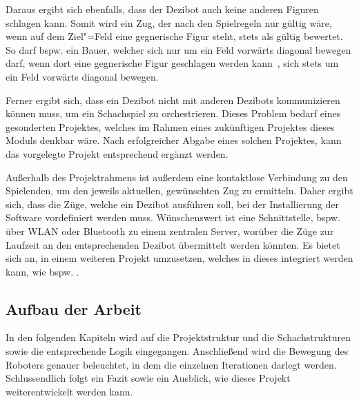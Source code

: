 
Daraus ergibt sich ebenfalls, dass der Dezibot auch keine anderen Figuren schlagen kann. Somit wird ein Zug, der nach den Spielregeln nur gültig wäre, wenn auf dem Ziel"=Feld eine gegnerische Figur steht, stets als gültig bewertet. So darf bspw. ein Bauer, welcher sich nur um ein Feld vorwärts diagonal bewegen darf, wenn dort eine gegnerische Figur geschlagen werden kann~\cite{justUSChessFederations2019}, sich stets um ein Feld vorwärts diagonal bewegen.


Ferner ergibt sich, dass ein Dezibot nicht mit anderen Dezibots kommunizieren können muss, um ein Schachspiel zu orchestrieren. Dieses Problem bedarf eines gesonderten Projektes, welches im Rahmen eines zukünftigen Projektes dieses Moduls denkbar wäre. Nach erfolgreicher Abgabe eines solchen Projektes, kann das vorgelegte Projekt entsprechend ergänzt werden.


Außerhalb des Projektrahmens ist außerdem eine kontaktlose Verbindung zu den Spielenden, um den jeweils aktuellen, gewünschten Zug zu ermitteln. Daher ergibt sich, dass die Züge, welche ein Dezibot ausführen soll, bei der Installierung der Software vordefiniert werden muss. Wünschenswert ist eine Schnittstelle, bspw. über WLAN oder Bluetooth zu einem zentralen Server, worüber die Züge zur Laufzeit an den entsprechenden Dezibot übermittelt werden könnten. Es bietet sich an, in einem weiteren Projekt umzusetzen, welches in dieses integriert werden kann, wie bspw. \cite{bruderMoseschmiedelDezibot2025,dietrichTimDietrichDezibotlogging2025,richterCurvesHubDezibotDebugInterface2025}.


\subsection{Aufbau der Arbeit}

In den folgenden Kapiteln wird auf die Projektstruktur und die Schachstrukturen sowie die entsprechende Logik eingegangen. Anschließend wird die Bewegung des Roboters genauer beleuchtet, in dem die einzelnen Iterationen darlegt werden. Schlussendlich folgt ein Fazit sowie ein Ausblick, wie dieses Projekt weiterentwickelt werden kann.

